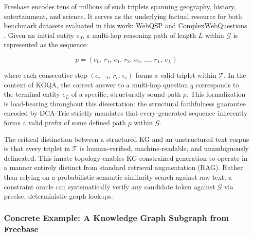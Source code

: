Freebase encodes tens of millions of such triplets spanning geography, history,
entertainment, and science. It serves as the underlying factual resource for
both benchmark datasets evaluated in this work: WebQSP \citep{yih2016value} and
ComplexWebQuestions \citep{talmor2018web}. Given an initial entity $e_0$, a multi-hop reasoning path of length $L$ within $\mathcal{G}$ is represented as the sequence:

\begin{equation}
    p = (e_0,\, r_1,\, e_1,\, r_2,\, e_2,\, \ldots,\, r_L,\, e_L)
    \label{eq:kgpath}
\end{equation}

where each consecutive step $(e_{i-1},\, r_i,\, e_i)$ forms a valid triplet within $\mathcal{T}$. In the context of KGQA, the correct answer to a multi-hop question $q$ corresponds to the terminal entity $e_L$ of a specific, structurally sound path $p$. This formalization is load-bearing throughout this dissertation: the structural faithfulness guarantee encoded by DCA-Trie strictly mandates that every generated sequence inherently forms a valid prefix of some defined path $p$ within $\mathcal{G}$.

The critical distinction between a structured KG and an unstructured text corpus is that every triplet in $\mathcal{T}$ is human-verified, machine-readable, and unambiguously delineated. This innate topology enables KG-constrained generation to operate in a manner entirely distinct from standard retrieval augmentation (RAG). Rather than relying on a probabilistic semantic similarity search against raw text, a constraint oracle can systematically verify any candidate token against $\mathcal{G}$ via precise, deterministic graph lookups.

\subsubsection{Concrete Example: A Knowledge Graph Subgraph from Freebase}

